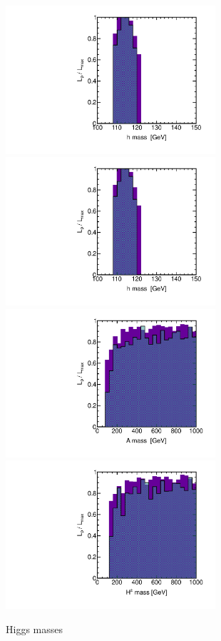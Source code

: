 \begin{figure}[htbp]
\begin{center}
\includegraphics[height=5.5cm]{figs/fig_h.pdf} 
\includegraphics[height=5.5cm]{figs/fig_H.pdf} \\
\includegraphics[height=5.5cm]{figs/fig_A.pdf} 
\includegraphics[height=5.5cm]{figs/fig_H_pm.pdf} 
\caption{Higgs masses}
\label{default}
\end{center}
\end{figure}


